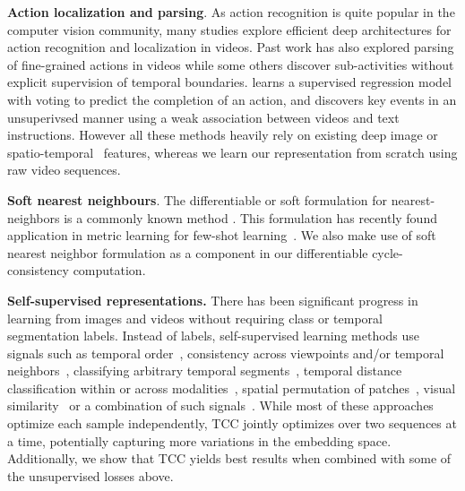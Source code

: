 \documentclass[10pt,twocolumn,letterpaper]{article}
\begin{document}
\noindent\textbf{Action localization and parsing}. As action recognition is quite popular in the computer vision community, many studies
\cite{wang2016temporal,sigurdsson2017asynchronous,zhao2017temporal,girdhar2017actionvlad,yeung2018every} explore efficient deep architectures for action recognition and localization in videos.  Past work has also explored parsing of fine-grained actions in videos \cite{pirsiavash2014parsing,lan2015action,lea2016segmental} while some others 
\cite{shechtman2007matching,del2015articulated, sener2015unsupervised,sener2018unsupervised} discover sub-activities without explicit supervision of temporal boundaries. \cite{heidarivincheh2018action} learns a supervised regression model with voting to predict the completion of an action, and \cite{Alayrac16unsupervised} discovers key events in an unsuperivsed manner using a weak association between videos and text instructions. 
However all these methods heavily rely on existing deep image \cite{he2016deep,simonyan2014very} or spatio-temporal~\cite{wang2013action} features, whereas we learn our representation from scratch using raw video sequences.    

\noindent\textbf{Soft nearest neighbours}. The differentiable or soft formulation for nearest-neighbors is a commonly known method \cite{goldberger2005neighbourhood}. This formulation has recently found application in metric learning for few-shot learning~\cite{snell2017prototypical, movshovitz2017no,rocco2018neighbourhood}. We also make use of soft nearest neighbor formulation as a component in our differentiable cycle-consistency computation.

\noindent\textbf{Self-supervised representations.} There has been significant progress in learning from images and videos without requiring class or temporal segmentation labels. Instead of labels, self-supervised learning methods use signals such as temporal order~\cite{misra2016shuffle,fernando2017self}, consistency across viewpoints and/or temporal neighbors~\cite{Sermanet2017TCN}, classifying arbitrary temporal segments~\cite{hyvarinen2016unsupervised}, temporal distance classification within or across modalities~\cite{aytar2018playing}, spatial permutation of patches~\cite{doersch2015unsupervised,anoop33deeppermnet}, visual similarity~\cite{sanakoyeu2018deep} or a combination of such signals~\cite{doersch2017multi}.
While most of these approaches optimize each sample independently, TCC jointly optimizes over two sequences at a time, potentially capturing more variations in the embedding space. Additionally, we show that TCC yields best results when combined with some of the unsupervised losses above.
\end{document}
